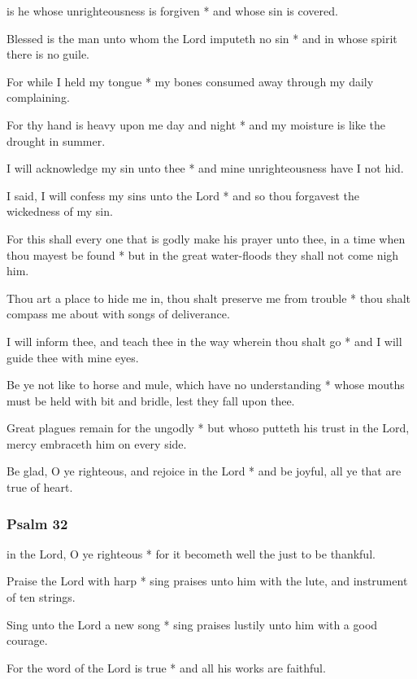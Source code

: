 
 is he whose unrighteousness is forgiven * and whose sin is covered.

Blessed is the man unto whom the Lord imputeth no sin * and in whose spirit there is no guile.

For while I held my tongue * my bones consumed away through my daily complaining.

For thy hand is heavy upon me day and night * and my moisture is like the drought in summer.

I will acknowledge my sin unto thee * and mine unrighteousness have I not hid.

I said, I will confess my sins unto the Lord * and so thou forgavest the wickedness of my sin.

For this shall every one that is godly make his prayer unto thee, in a time when thou mayest be found * but in the great water-floods they shall not come nigh him.

Thou art a place to hide me in, thou shalt preserve me from trouble * thou shalt compass me about with songs of deliverance.

I will inform thee, and teach thee in the way wherein thou shalt go * and I will guide thee with mine eyes.

Be ye not like to horse and mule, which have no understanding * whose mouths must be held with bit and bridle, lest they fall upon thee.

Great plagues remain for the ungodly * but whoso putteth his trust in the Lord, mercy embraceth him on every side.

Be glad, O ye righteous, and rejoice in the Lord * and be joyful, all ye that are true of heart.

\subsubsection{Psalm 32}


 in the Lord, O ye righteous * for it becometh well the just to be thankful.

Praise the Lord with harp * sing praises unto him with the lute, and instrument of ten strings.

Sing unto the Lord a new song * sing praises lustily unto him with a good courage.

For the word of the Lord is true * and all his works are faithful.

